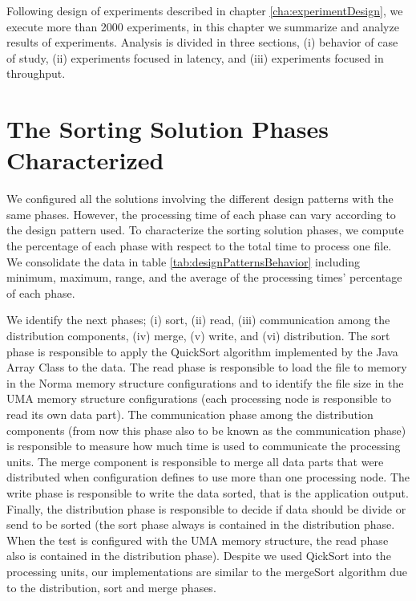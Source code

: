 Following design of experiments described in chapter \ref{cha:experimentDesign}, we execute more than 2000 experiments, in this chapter we summarize and analyze results of experiments. Analysis is divided in three sections, (i) behavior of case of study, (ii) experiments focused in latency, and (iii) experiments focused in throughput. 

\section{The Sorting Solution Phases Characterized}
We configured all the solutions involving the different design patterns with the same phases. However, the processing time of each phase can vary according to the design pattern used. To characterize the sorting solution phases, we compute the percentage of each phase with respect to the total time to process one file. We consolidate the data in table \ref{tab:designPatternsBehavior} including minimum, maximum, range, and the average of the processing times' percentage of each phase. 


We identify the next phases; (i) sort, (ii) read, (iii) communication among the distribution components, (iv) merge, (v) write, and (vi) distribution. The sort phase is responsible to apply the QuickSort algorithm implemented by the Java Array Class to the data. The read phase is responsible to load the file to memory in the Norma memory structure configurations and to identify the file size in the UMA memory structure configurations (each processing node is responsible to read its own data part). The communication phase among the distribution components (from now this phase also to be known as the communication phase) is responsible to measure how much time is used to communicate the processing units. The merge component is responsible to merge all data parts that were distributed when configuration defines to use more than one processing node. The write phase is responsible to write the data sorted, that is the application output. Finally, the distribution phase is responsible to decide if data should be divide or send to be sorted (the sort phase always is contained in the distribution phase. When the test is configured with the UMA memory structure, the read phase also is contained in the distribution phase). Despite we used QickSort into the processing units, our implementations are similar to the mergeSort algorithm due to the distribution, sort and merge phases.

